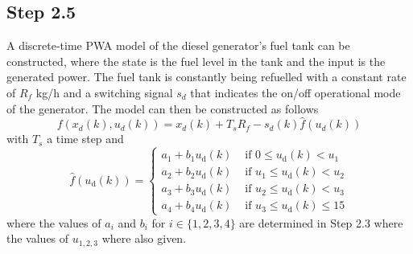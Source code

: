 \subsection*{Step 2.5}
A discrete-time PWA model of the diesel generator's fuel tank can be constructed, where the state is the fuel level in the tank and the input is the generated power. The fuel tank is constantly being refuelled with a constant rate of $R_f$ kg/h and a switching signal $s_d$ that indicates the on/off operational mode of the generator. The model can then be constructed as follows
$$
f(x_d(k),u_d(k)) = x_d(k) + T_sR_f - s_d(k)\hat{f}(u_d(k))
$$
with $T_s$ a time step and
$$
\hat{f}\left(u_{\mathrm{d}}(k)\right)=\left\{\begin{array}{ll}
a_{1}+b_{1} u_{\mathrm{d}}(k) & \text { if } 0 \leq u_{\mathrm{d}}(k)<u_{1} \\
a_{2}+b_{2} u_{\mathrm{d}}(k) & \text { if } u_{1} \leq u_{\mathrm{d}}(k)<u_{2} \\
a_{3}+b_{3} u_{\mathrm{d}}(k) & \text { if } u_{2} \leq u_{\mathrm{d}}(k)<u_{3} \\
a_{4}+b_{4} u_{\mathrm{d}}(k) & \text { if } u_{3} \leq u_{\mathrm{d}}(k) \leq 15
\end{array}\right.
$$
where the values of $a_i$ and $b_i$ for $i \in \{1,2,3,4\}$ are determined in Step 2.3 where the values of $u_{1,2,3}$ where also given. 